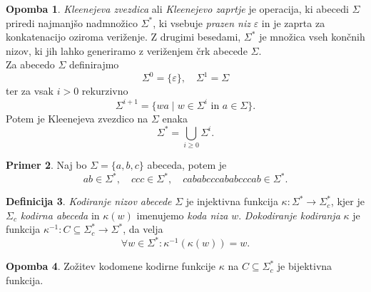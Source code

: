 \documentclass{amsart}
\theoremstyle{definition} %
\newtheorem{definicija}{Definicija}[section]
\newtheorem{primer}[definicija]{Primer}
\newtheorem{opomba}[definicija]{Opomba}
\theoremstyle{plain} %
\begin{document}
\begin{opomba}
    
    \textit{Kleenejeva zvezdica} ali \textit{Kleenejevo zaprtje} je operacija, ki
    abecedi $ \Sigma $ priredi najmanjšo nadmnožico $ \Sigma^* $, ki vsebuje
    \textit{prazen niz} $ \varepsilon $ in je zaprta za konkatenacijo oziroma veriženje.
    Z drugimi besedami, $ \Sigma^* $ je množica vseh končnih nizov, ki
    jih lahko generiramo z veriženjem črk abecede $ \Sigma $. \\
    Za abecedo $ \Sigma $ definirajmo
    \[
        \Sigma^0 = \{ \varepsilon \}, \quad \Sigma^1 = \Sigma
    \]
    ter za vsak $ i > 0 $ rekurzivno
    \[
        \Sigma^{i+1} = \{ wa \mid w \in \Sigma^i \text{ in } a \in \Sigma \}.
    \]
    Potem je Kleenejeva zvezdico na $ \Sigma $ enaka
    \[
        \Sigma^* = \bigcup_{i \geq 0} \Sigma^i.
    \]

\end{opomba}

\begin{primer}
    
    Naj bo $ \Sigma = \{ a,b,c \} $ abeceda, potem je
    \[
        ab \in \Sigma^*, \quad ccc \in \Sigma^*, \quad cababcccababcccab \in \Sigma^*.
    \]

\end{primer}

\begin{definicija}
    
    \textit{Kodiranje nizov abecede} $ \Sigma $ je injektivna funkcija $ \kappa \colon \Sigma^* 
    \to \Sigma_c^* $, kjer je $ \Sigma_c $ \textit{kodirna abeceda} in $ \kappa(w) $ imenujemo
    \textit{koda niza} $ w $. \textit{Dokodiranje kodiranja} $ \kappa $ je funkcija 
    $ \kappa^{-1} \colon C \subseteq \Sigma^*_c \to \Sigma^* $, da velja
    \[
        \forall w \in \Sigma^* \colon \kappa^{-1}(\kappa(w)) = w.
    \]

\end{definicija}

\begin{opomba}
    
    Zožitev kodomene kodirne funkcije $ \kappa $ na $ C \subseteq \Sigma^*_c $ je bijektivna funkcija.

\end{opomba}
\end{document}
